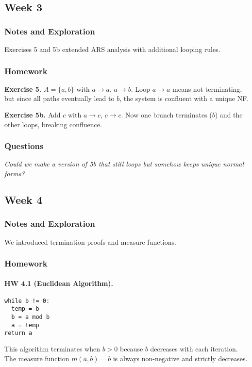 \documentclass[11pt]{article}
\begin{document}
\subsection{Week 3}

\subsubsection{Notes and Exploration}
Exercises 5 and 5b extended ARS analysis with additional looping rules.

\subsubsection{Homework}
\textbf{Exercise 5.}  
$A=\{a,b\}$ with $a\to a$, $a\to b$.  
Loop $a\to a$ means not terminating, but since all paths eventually lead to $b$, the system is confluent with a unique NF.

\textbf{Exercise 5b.}  
Add $c$ with $a\to c$, $c\to c$.  
Now one branch terminates ($b$) and the other loops, breaking confluence.

\subsubsection{Questions}
\emph{Could we make a version of 5b that still loops but somehow keeps unique normal forms?}

\subsection{Week 4}

\subsubsection{Notes and Exploration}
We introduced termination proofs and measure functions.

\subsubsection{Homework}
\paragraph{HW 4.1 (Euclidean Algorithm).}
\begin{verbatim}
while b != 0:
  temp = b
  b = a mod b
  a = temp
return a
\end{verbatim}
This algorithm terminates when $b>0$ because $b$ decreases with each iteration.  
The measure function $m(a,b)=b$ is always non-negative and strictly decreases.
\end{document}
